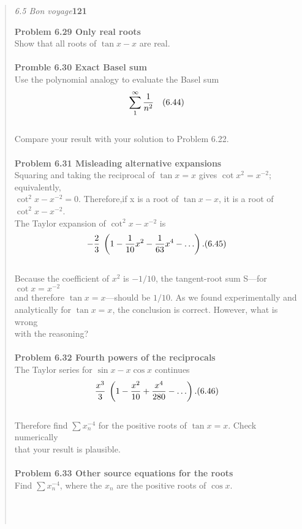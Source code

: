 \documentclass[a4paper,fleqn]{book}
\title{}
\date{}
\begin{document}
\pagestyle{empty}
\begin{quote}
\large\textit{6.5 Bon voyage}\hfill \textbf{121} \\

\colorbox{light-gray}{
\begin{minipage}{\textwidth}
\textbf{Problem 6.29 \; Only real roots}\\
Show that all roots of $\tan x-x$ are real.\\\\
\textbf{Promble 6.30 \; Exact Basel sum}\\
Use the polynomial analogy to evaluate the Basel sum\\
\[\sum_{1}^\infty \frac{1}{n^2} \quad\hfill(6.44)\]\\
Compare your result with your solution to Problem 6.22.\\\\
\textbf{Problem 6.31 \; Misleading alternative expansions}\\
Squaring and taking the reciprocal of $\tan x=x$ gives $\cot x^2=x^{-2}$; equivalently,\\
${\cot}^2x-x^{-2}=0$. Therefore,if x is a root of $\tan x-x$, it is a root of ${\cot}^2x-x^{-2}$.\\
The Taylor expansion of ${\cot}^2x-x^{-2}$ is\\
\[-\frac{2}{3}\;\left(1-\frac{1}{10}x^2-\frac{1}{63}x^4-\ldots\right).\hfill(6.45)\]\\
Because the coefficient of $x^2$ is $-1/10$, the tangent-root sum S---for $\cot x=x^{-2}$\\
and therefore $\tan x=x$---should be $1/10$. \;As we found experimentally and\\
analytically for $\tan x=x$, the conclusion is correct.  However, what is wrong\\
with the reasoning?\\\\
\textbf{Problem 6.32 \; Fourth powers of the reciprocals}\\
The Taylor series for $\sin x-x\cos x$ continues\\
\[\frac{x^3}{3}\;\left(1-\frac{x^2}{10}+\frac{x^4}{280}-\ldots\right).\hfill(6.46)\]\\
Therefore find $\sum x_n^{-4}$ for the positive roots of $\tan x=x$. \;Check numerically\\
that your result is plausible.\\\\
\textbf{Problem 6.33 \; Other source equations for the roots}\\
Find $\sum x_n^{-4}$, where the $x_n$ are the positive roots of $\cos x$.
\end{minipage}
}\\\\
\end{quote}
\end{document}
